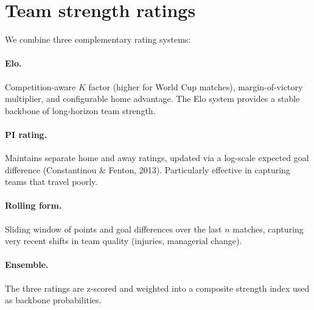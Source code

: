 \section{Team strength ratings}
We combine three complementary rating systems:
\paragraph{Elo.} Competition-aware $K$ factor (higher for World Cup matches),
margin-of-victory multiplier, and configurable home advantage. The Elo system
provides a stable backbone of long-horizon team strength.
\paragraph{PI rating.} Maintains separate home and away ratings, updated via a
log-scale expected goal difference (Constantinou \& Fenton, 2013). Particularly
effective in capturing teams that travel poorly.
\paragraph{Rolling form.} Sliding window of points and goal differences over
the last $n$ matches, capturing very recent shifts in team quality (injuries,
managerial change).
\paragraph{Ensemble.} The three ratings are z-scored and weighted into a
composite strength index used as backbone probabilities.
